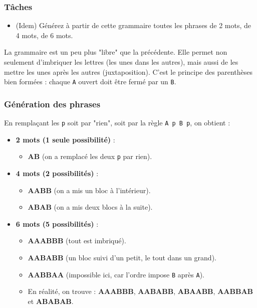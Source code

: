 \subsubsection*{Tâches}
\begin{itemize}
    \item (Idem) Générez à partir de cette grammaire toutes les phrases de 2 mots, de 4 mots, de 6 mots.
\end{itemize}
La grammaire est un peu plus "libre" que la précédente. Elle permet non seulement d'imbriquer les lettres (les unes dans les autres), mais aussi de les mettre les unes après les autres (juxtaposition). C'est le principe des parenthèses bien formées : chaque \texttt{A} ouvert doit être fermé par un \texttt{B}.

\subsubsection*{Génération des phrases}

En remplaçant les \texttt{p} soit par "rien", soit par la règle \texttt{A p B p}, on obtient :

\begin{itemize}
    \item \textbf{2 mots (1 seule possibilité)} :
    \begin{itemize}
        \item \textbf{AB} (on a remplacé les deux \texttt{p} par rien).
    \end{itemize}

    \item \textbf{4 mots (2 possibilités)} :
    \begin{itemize}
        \item \textbf{AABB} (on a mis un bloc à l'intérieur).
        \item \textbf{ABAB} (on a mis deux blocs à la suite).
    \end{itemize}

    \item \textbf{6 mots (5 possibilités)} :
    \begin{itemize}
        \item \textbf{AAABBB} (tout est imbriqué).
        \item \textbf{AABABB} (un bloc suivi d'un petit, le tout dans un grand).
        \item \textbf{AABBAA} (impossible ici, car l'ordre impose \texttt{B} après \texttt{A}).
        \item En réalité, on trouve : \textbf{AAABBB}, \textbf{AABABB}, \textbf{ABAABB}, \textbf{AABBAB} et \textbf{ABABAB}. 
    \end{itemize}
\end{itemize}

